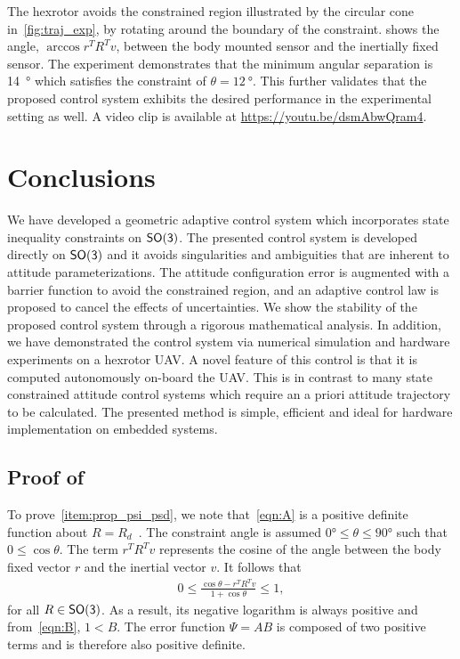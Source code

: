 \documentclass[10pt,fleqn]{IJCAS}  %
\begin{document}
\begin{multicols}{2}
The hexrotor avoids the constrained region illustrated by the circular cone in~\cref{fig:traj_exp}, by rotating around the boundary of the constraint. 
 shows the angle, \( \arccos r^T R^T v \), between the body mounted sensor and the inertially fixed sensor.
The experiment demonstrates that the minimum angular separation is \SI{14}{\degree} which satisfies the constraint of \( \theta = \SI{12}{\degree} \).
This further validates that the proposed control system exhibits the desired performance in the experimental setting as well. 
A video clip is available at \url{https://youtu.be/dsmAbwQram4}.

\section{Conclusions}\label{sec:conclusions}
We have developed a geometric adaptive control system which incorporates state inequality constraints on \(\mathsf{SO(3)}\).
The presented control system is developed directly on \(\mathsf{SO(3)}\) and it avoids singularities and ambiguities that are inherent to attitude parameterizations.
The attitude configuration error is augmented with a barrier function to avoid the constrained region, and an adaptive control law is proposed to cancel the effects of uncertainties. 
We show the stability of the  proposed control system through a rigorous mathematical analysis.
In addition, we have demonstrated the control system via numerical simulation and hardware experiments on a hexrotor UAV.
A novel feature of this control is that it is computed autonomously on-board the UAV.
This is in contrast to many state constrained attitude control systems which require an a priori attitude trajectory to be calculated. 
The presented method is simple, efficient and ideal for hardware implementation on embedded systems.

\appendix
\subsection{Proof of~}\label{proof:config_error}
To prove~\cref{item:prop_psi_psd}, we note that~\cref{eqn:A} is a positive definite function about \( R = R_d \)~\cite{bullo2004}.
The constraint angle is assumed \( \ang{0} \leq \theta \leq \ang{90} \) such that \( 0 \leq \cos \theta \).
The term \( r^T R^T v \) represents the cosine of the angle between the body fixed vector \( r \) and the inertial vector \( v \). 
It follows that
\begin{align*}
	0 \leq  \frac{\cos \theta -  r^T R^T v}{1 + \cos \theta} \leq 1 ,
\end{align*}
for all \( R \in \mathsf{SO(3)} \). 
As a result, its negative logarithm is always positive and from~\cref{eqn:B}, \(1 < B\).
The error function \( \Psi = A B \) is composed of two positive terms and is therefore also positive definite.


\end{multicols}
\end{document}
